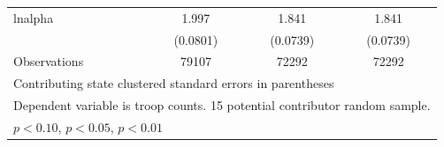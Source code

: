 \documentclass{beamer}
\begin{document}
\begin{frame}[fragile]
\begin{table}[htbp]
\begin{tabular}{l*{3}{c}}
\hline
lnalpha             &       1.997\sym{**}&       1.841\sym{**}&       1.841\sym{**}\\
                    &    (0.0801)        &    (0.0739)        &    (0.0739)        \\
\hline
Observations        &       79107        &       72292        &       72292        \\
\hline\hline
\multicolumn{4}{l}{\tiny Contributing state clustered standard errors in parentheses}\\
\multicolumn{4}{l}{\tiny Dependent variable is troop counts. 15 potential contributor random sample.}\\
\multicolumn{4}{l}{\tiny \sym{\dagger} \(p<0.10\), \sym{*} \(p<0.05\), \sym{**} \(p<0.01\)}\\
\end{tabular}
\end{table}

\end{frame}


\end{document}
